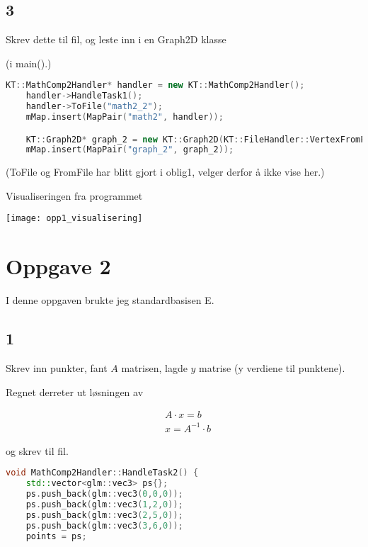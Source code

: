 ﻿\documentclass[14]{article}
\begin{document}
\begin{flushleft}
        \subsection*{3}
        
        Skrev dette til fil, og leste inn i en Graph2D klasse

        (i main().)
        \begin{lstlisting}[language=C++, caption=main() del som lagrer klasse med oblig logic og 2d graf klasse som leser dataen]
    KT::MathComp2Handler* handler = new KT::MathComp2Handler(); 
    handler->HandleTask1();
    handler->ToFile("math2_2");
    mMap.insert(MapPair("math2", handler));

    KT::Graph2D* graph_2 = new KT::Graph2D(KT::FileHandler::VertexFromFile("math2_2"));
    mMap.insert(MapPair("graph_2", graph_2));

        \end{lstlisting}
        (ToFile og FromFile har blitt gjort i oblig1, velger derfor å ikke vise her.)
        
        Visualiseringen fra programmet
        
        \texttt{[image: opp1\_visualisering]}

        \section{Oppgave 2}
        I denne oppgaven brukte jeg standardbasisen E.
        \subsection*{1}
        
        Skrev inn punkter, fant \(A\) matrisen, lagde \(y\) matrise (y verdiene til punktene). 
        
        Regnet derreter ut løsningen av
        
        \begin{align*}
            & A\cdot x = b \\
            & x = A^{-1}\cdot b
        \end{align*}
        
        og skrev til fil.
        
        \begin{lstlisting}[language=C++, caption=Oppgave 2 numerisk utregning]
void MathComp2Handler::HandleTask2() {
    std::vector<glm::vec3> ps{};
    ps.push_back(glm::vec3(0,0,0));
    ps.push_back(glm::vec3(1,2,0));
    ps.push_back(glm::vec3(2,5,0));
    ps.push_back(glm::vec3(3,6,0));
    points = ps;


\end{lstlisting}
\end{flushleft}
\end{document}
